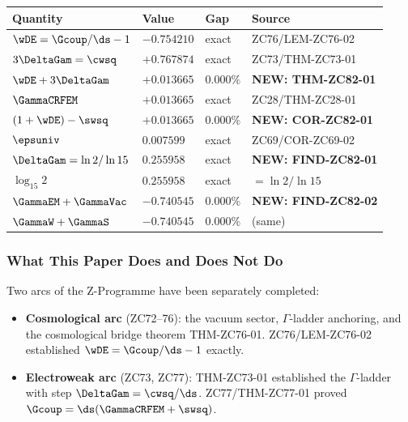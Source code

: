 \documentclass[12pt, a4paper]{article}
\begin{document}
\begin{keybox}[title={Numerical Summary --- ZC82 (T-canonical)}]
{\small\renewcommand{\arraystretch}{1.25}
\begin{center}
\begin{tabular}{@{}p{5.8cm}p{2.4cm}p{1.6cm}p{2.6cm}@{}}
\toprule
\textbf{Quantity} & \textbf{Value} & \textbf{Gap} & \textbf{Source} \\
\midrule
$\wDE = \Gcoup/\ds - 1$     & $-0.754210$ & exact & ZC76/LEM-ZC76-02 \\
$3\DeltaGam = \cwsq$        & $+0.767874$ & exact & ZC73/THM-ZC73-01 \\
$\wDE + 3\DeltaGam$         & $+0.013665$ & $0.000\%$ & \textbf{NEW: THM-ZC82-01} \\
$\GammaCRFEM$               & $+0.013665$ & exact & ZC28/THM-ZC28-01 \\
\midrule
$(1+\wDE) - \swsq$          & $+0.013665$ & $0.000\%$ & \textbf{NEW: COR-ZC82-01} \\
\midrule
$\epsuniv$                  & $0.007599$ & exact & ZC69/COR-ZC69-02 \\
\midrule
$\DeltaGam = \ln2/\ln15$    & $0.255958$ & exact & \textbf{NEW: FIND-ZC82-01} \\
$\log_{15}2$                & $0.255958$ & exact & $= \ln2/\ln15$ \\
\midrule
$\GammaEM + \GammaVac$      & $-0.740545$ & $0.000\%$ & \textbf{NEW: FIND-ZC82-02} \\
$\GammaW + \GammaS$         & $-0.740545$ & $0.000\%$ & (same) \\
\bottomrule
\end{tabular}
\end{center}}
\end{keybox}

\subsubsection{What This Paper Does and Does Not Do}

Two arcs of the Z-Programme have been separately completed:

\begin{itemize}[leftmargin=2em, noitemsep]
  \item \textbf{Cosmological arc} (ZC72--76): the vacuum sector,
    $\Gamma$-ladder anchoring, and the cosmological bridge theorem
    THM-ZC76-01. ZC76/LEM-ZC76-02 established
    $\wDE = \Gcoup/\ds - 1$ exactly.
  \item \textbf{Electroweak arc} (ZC73, ZC77): THM-ZC73-01
    established the $\Gamma$-ladder with step
    $\DeltaGam = \cwsq/\ds$. ZC77/THM-ZC77-01 proved
    $\Gcoup = \ds(\GammaCRFEM + \swsq)$.
\end{itemize}
\end{document}
